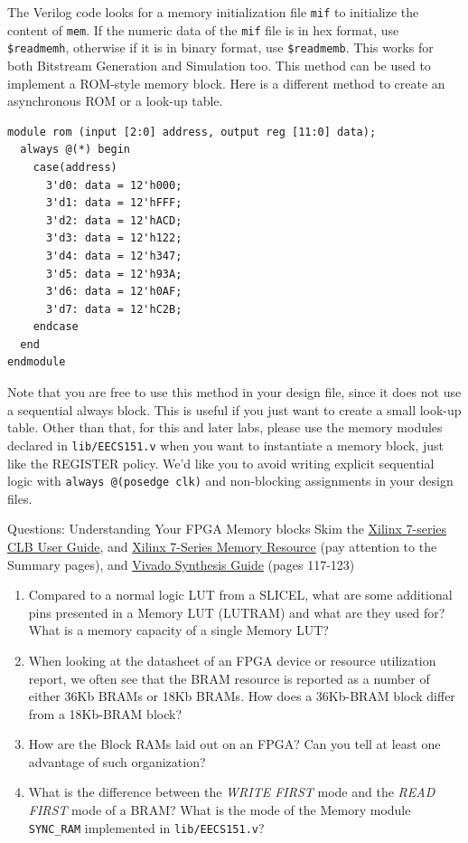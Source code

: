 \documentclass[11pt]{article}
\makeatletter
\renewcommand{\subsection}
{\@startsection {subsection}{1}{0pt}
 {-1ex}
 {0.5ex}
 {\bfseries\normalsize}}
\makeatother
\begin{document}
{The Verilog code looks for a memory initialization file \verb|mif| to initialize the content of \verb|mem|. If the numeric data of the \verb|mif| file is in hex format, use \verb|$readmemh|, otherwise if it is in binary format, use \verb|$readmemb|. This works for both Bitstream Generation and Simulation too.
This method can be used to implement a ROM-style memory block. Here is a different method to create an asynchronous ROM or a look-up table.

\begin{verbatim}
module rom (input [2:0] address, output reg [11:0] data);
  always @(*) begin
    case(address)
      3'd0: data = 12'h000;
      3'd1: data = 12'hFFF;
      3'd2: data = 12'hACD;
      3'd3: data = 12'h122;
      3'd4: data = 12'h347;
      3'd5: data = 12'h93A;
      3'd6: data = 12'h0AF;
      3'd7: data = 12'hC2B;
    endcase
  end
endmodule
\end{verbatim}

Note that you are free to use this method in your design file, since it does not use a sequential always block. This is useful if you just want to create a small look-up table. Other than that, for this and later labs, please use the memory modules declared in \verb|lib/EECS151.v| when you want to instantiate a memory block, just like the REGISTER policy. We'd like you to avoid writing explicit sequential logic with \verb|always @(posedge clk)| and non-blocking assignments in your design files.

\subsection{Questions: Understanding Your FPGA Memory blocks}\label{sec:Q1}
Skim the \href{http://www.xilinx.com/support/documentation/user_guides/ug474_7Series_CLB.pdf}{Xilinx 7-series CLB User Guide}, and \href{https://www.xilinx.com/support/documentation/user_guides/ug473_7Series_Memory_Resources.pdf}{Xilinx 7-Series Memory Resource} (pay attention to the Summary pages), and \href{https://www.xilinx.com/support/documentation/sw_manuals/xilinx2019_2/ug901-vivado-synthesis.pdf}{Vivado Synthesis Guide} (pages 117-123)
\begin{enumerate} 
\item Compared to a normal logic LUT from a SLICEL, what are some additional pins presented in a Memory LUT (LUTRAM) and what are they used for? What is a memory capacity of a single Memory LUT?
\item When looking at the datasheet of an FPGA device or resource utilization report, we often see that the BRAM resource is reported as a number of either 36Kb BRAMs or 18Kb BRAMs. How does a 36Kb-BRAM block differ from a 18Kb-BRAM block?
\item How are the Block RAMs laid out on an FPGA? Can you tell at least one advantage of such organization?
\item What is the difference between the \textit{WRITE FIRST} mode and the \textit{READ FIRST} mode of a BRAM? What is the mode of the Memory module \texttt{SYNC\_RAM} implemented in \verb|lib/EECS151.v|?
\end{enumerate}

}
\end{document}
